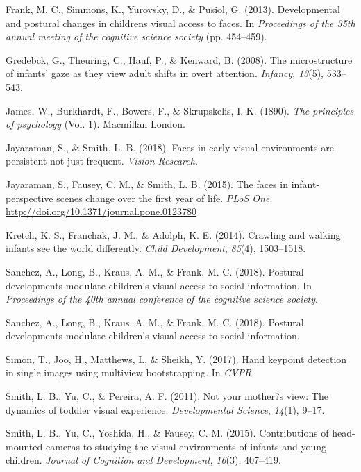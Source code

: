 \documentclass[10pt, letterpaper]{article}
\begin{document}
\hypertarget{ref-frank2013}{}
Frank, M. C., Simmons, K., Yurovsky, D., \& Pusiol, G. (2013).
Developmental and postural changes in childrens visual access to faces.
In \emph{Proceedings of the 35th annual meeting of the cognitive science
society} (pp. 454--459).

\hypertarget{ref-gredeback2008microstructure}{}
Gredebck, G., Theuring, C., Hauf, P., \& Kenward, B.
(2008). The microstructure of infants' gaze as they view adult shifts in
overt attention. \emph{Infancy}, \emph{13}(5), 533--543.

\hypertarget{ref-james1890principles}{}
James, W., Burkhardt, F., Bowers, F., \& Skrupskelis, I. K. (1890).
\emph{The principles of psychology} (Vol. 1). Macmillan London.

\hypertarget{ref-Jayaraman2018}{}
Jayaraman, S., \& Smith, L. B. (2018). Faces in early visual
environments are persistent not just frequent. \emph{Vision Research}.

\hypertarget{ref-Jayaraman2015}{}
Jayaraman, S., Fausey, C. M., \& Smith, L. B. (2015). The faces in
infant-perspective scenes change over the first year of life. \emph{PLoS
One}. \url{http://doi.org/10.1371/journal.pone.0123780}

\hypertarget{ref-kretch2014}{}
Kretch, K. S., Franchak, J. M., \& Adolph, K. E. (2014). Crawling and
walking infants see the world differently. \emph{Child Development},
\emph{85}(4), 1503--1518.

\hypertarget{ref-Sanchez2018}{}
Sanchez, A., Long, B., Kraus, A. M., \& Frank, M. C. (2018). Postural
developments modulate children's visual access to social information. In
\emph{Proceedings of the 40th annual conference of the cognitive science
society}.

\hypertarget{ref-sanchez2018postural}{}
Sanchez, A., Long, B., Kraus, A. M., \& Frank, M. C. (2018). Postural
developments modulate children's visual access to social information.

\hypertarget{ref-Simon2017hand}{}
Simon, T., Joo, H., Matthews, I., \& Sheikh, Y. (2017). Hand keypoint
detection in single images using multiview bootstrapping. In
\emph{CVPR}.

\hypertarget{ref-smith2011not}{}
Smith, L. B., Yu, C., \& Pereira, A. F. (2011). Not your mother?s view:
The dynamics of toddler visual experience. \emph{Developmental Science},
\emph{14}(1), 9--17.

\hypertarget{ref-smith2015contributions}{}
Smith, L. B., Yu, C., Yoshida, H., \& Fausey, C. M. (2015).
Contributions of head-mounted cameras to studying the visual
environments of infants and young children. \emph{Journal of Cognition
and Development}, \emph{16}(3), 407--419.
\end{document}
